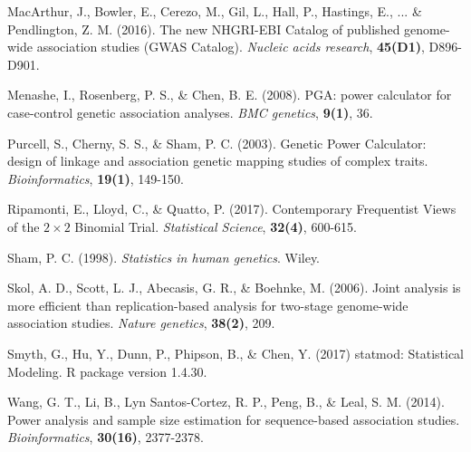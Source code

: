 \documentclass[11pt]{article}
\theoremstyle{definition}
\begin{document}
\begin{thebibliography}{}
{
MacArthur, J., Bowler, E., Cerezo, M., Gil, L., Hall, P., Hastings, E., ... \& Pendlington, Z. M. (2016). 
The new NHGRI-EBI Catalog of published genome-wide association studies (GWAS Catalog). 
{\it Nucleic acids research}, {\bf 45(D1)}, D896-D901.

Menashe, I., Rosenberg, P. S., \& Chen, B. E. (2008). 
PGA: power calculator for case-control genetic association analyses. 
{\it BMC genetics}, {\bf 9(1)}, 36.

Purcell, S., Cherny, S. S., \& Sham, P. C. (2003). 
Genetic Power Calculator: design of linkage and association genetic mapping studies of complex traits. 
{\it Bioinformatics}, {\bf 19(1)}, 149-150.

Ripamonti, E., Lloyd, C., \& Quatto, P. (2017). 
Contemporary Frequentist Views of the $2\times2$ Binomial Trial. 
{\it Statistical Science}, {\bf 32(4)}, 600-615.

Sham, P. C. (1998). {\it Statistics in human genetics}. Wiley.

Skol, A. D., Scott, L. J., Abecasis, G. R., \& Boehnke, M. (2006). 
Joint analysis is more efficient than replication-based analysis for two-stage genome-wide association studies. 
{\it Nature genetics}, {\bf 38(2)}, 209.

Smyth, G., Hu, Y., Dunn, P., Phipson, B., \& Chen, Y. (2017)
statmod: Statistical Modeling.
R package version 1.4.30.

Wang, G. T., Li, B., Lyn Santos-Cortez, R. P., Peng, B., \& Leal, S. M. (2014).
Power analysis and sample size estimation for sequence-based association studies. 
{\it Bioinformatics}, {\bf 30(16)}, 2377-2378.
}

\end{thebibliography}
\end{document}
